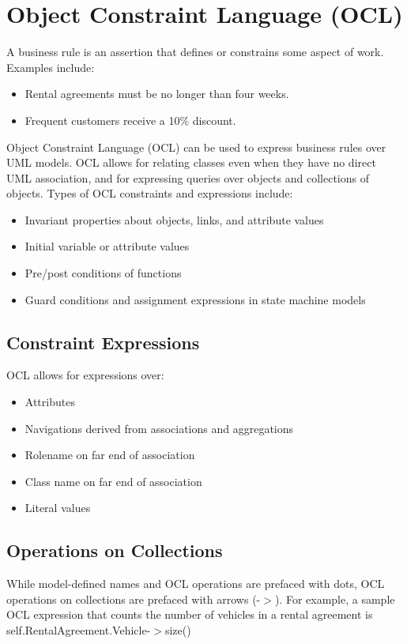 \documentclass[12pt,titlepage]{article}
\let\stdsection\section
\renewcommand\section{\clearpage\stdsection}
\begin{document}
  \section{Object Constraint Language (OCL)}
    A business rule is an assertion that defines or constrains some aspect of work. Examples include:
    \begin{itemize}
      \item Rental agreements must be no longer than four weeks.
      \item Frequent customers receive a 10\% discount.
    \end{itemize}

    Object Constraint Language (OCL) can be used to express business rules over UML models. OCL allows for relating classes even when they have no direct UML
    association, and for expressing queries over objects and collections of objects. Types of OCL constraints and expressions include:
    \begin{itemize}
      \item Invariant properties about objects, links, and attribute values
      \item Initial variable or attribute values
      \item Pre/post conditions of functions
      \item Guard conditions and assignment expressions in state machine models
    \end{itemize}

    \subsection{Constraint Expressions}
      OCL allows for expressions over:
      \begin{itemize}
        \item Attributes
        \item Navigations derived from associations and aggregations
        \item Rolename on far end of association
        \item Class name on far end of association
        \item Literal values
      \end{itemize}

    \subsection{Operations on Collections}
      While model-defined names and OCL operations are prefaced with dots, OCL operations on collections are prefaced with arrows (-$>$).
      For example, a sample OCL expression that counts the number of vehicles in a rental agreement is self.RentalAgreement.Vehicle-$>$size()
\end{document}
